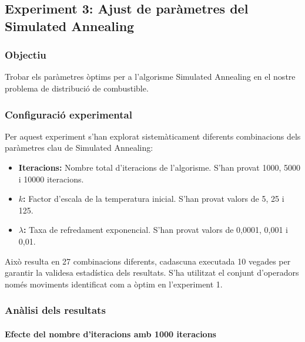 \subsection{Experiment 3: Ajust de paràmetres del Simulated Annealing}

\vspace{0.75cm}

\vspace{0.5cm}


\subsubsection{Objectiu}
Trobar els paràmetres òptims per a l'algorisme Simulated Annealing en el nostre problema de distribució de combustible.

\vspace{0.5cm}


\subsubsection{Configuració experimental}

Per aquest experiment s'han explorat sistemàticament diferents combinacions dels paràmetres clau de Simulated Annealing:

\begin{itemize}
    \item \textbf{Iteracions:} Nombre total d'iteracions de l'algorisme. S'han provat 1000, 5000 i 10000 iteracions.
    \item \textbf{$k$:} Factor d'escala de la temperatura inicial. S'han provat valors de 5, 25 i 125.
    \item \textbf{$\lambda$:} Taxa de refredament exponencial. S'han provat valors de 0,0001, 0,001 i 0,01.
\end{itemize}

Això resulta en 27 combinacions diferents, cadascuna executada 10 vegades per garantir la validesa estadística dels resultats. S'ha utilitzat el conjunt d'operadors només moviments identificat com a òptim en l'experiment 1.

\vspace{0.5cm}


\subsubsection{Anàlisi dels resultats}

\paragraph{Efecte del nombre d'iteracions amb 1000 iteracions}

